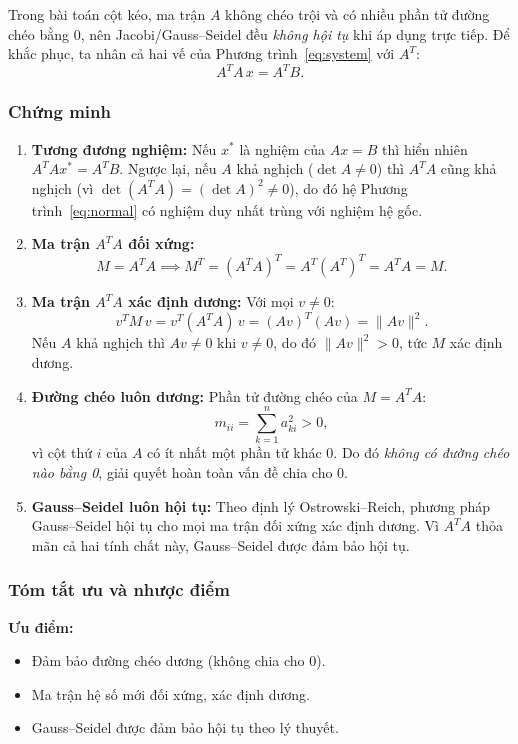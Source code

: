 \documentclass[12pt,a4paper]{article}
\begin{document}
Trong bài toán cột kéo, ma trận $A$ không chéo trội và có nhiều phần tử đường chéo bằng 0, nên Jacobi/Gauss--Seidel đều \emph{không hội tụ} khi áp dụng trực tiếp. Để khắc phục, ta nhân cả hai vế của Phương trình~\eqref{eq:system} với $A^T$:
\begin{equation}
    A^T A\,x = A^T B.
    \label{eq:normal}
\end{equation}

\subsubsection{Chứng minh}

\begin{enumerate}
    \item \textbf{Tương đương nghiệm:} Nếu $x^*$ là nghiệm của $Ax=B$ thì hiển nhiên $A^TAx^* = A^TB$. Ngược lại, nếu $A$ khả nghịch ($\det A\neq 0$) thì $A^TA$ cũng khả nghịch (vì $\det(A^TA)=(\det A)^2\neq 0$), do đó hệ Phương trình~\eqref{eq:normal} có nghiệm duy nhất trùng với nghiệm hệ gốc.

    \item \textbf{Ma trận $A^TA$ đối xứng:}
    \[
        M = A^TA \implies M^T = (A^TA)^T = A^T(A^T)^T = A^TA = M.
    \]

    \item \textbf{Ma trận $A^TA$ xác định dương:} Với mọi $v\neq 0$:
    \[
        v^T M\,v = v^T(A^TA)\,v = (Av)^T(Av) = \|Av\|^2.
    \]
    Nếu $A$ khả nghịch thì $Av\neq 0$ khi $v\neq 0$, do đó $\|Av\|^2 > 0$, tức $M$ xác định dương.

    \item \textbf{Đường chéo luôn dương:} Phần tử đường chéo của $M=A^TA$:
    \[
        m_{ii} = \sum_{k=1}^{n} a_{ki}^2 > 0,
    \]
    vì cột thứ $i$ của $A$ có ít nhất một phần tử khác 0. Do đó \emph{không có đường chéo nào bằng 0}, giải quyết hoàn toàn vấn đề chia cho 0.

    \item \textbf{Gauss--Seidel luôn hội tụ:} Theo định lý Ostrowski--Reich, phương pháp Gauss--Seidel hội tụ cho mọi ma trận đối xứng xác định dương. Vì $A^TA$ thỏa mãn cả hai tính chất này, Gauss--Seidel được đảm bảo hội tụ.
\end{enumerate}

\subsubsection{Tóm tắt ưu và nhược điểm}

\textbf{Ưu điểm:}
\begin{itemize}
    \item Đảm bảo đường chéo dương (không chia cho 0).
    \item Ma trận hệ số mới đối xứng, xác định dương.
    \item Gauss--Seidel được đảm bảo hội tụ theo lý thuyết.
\end{itemize}
\end{document}
